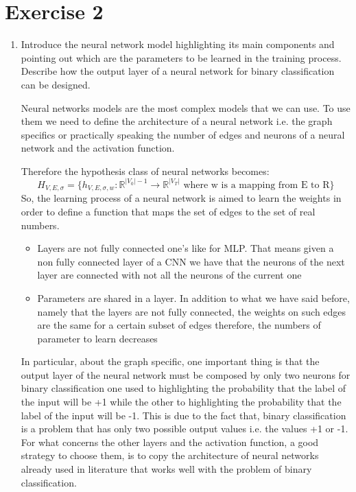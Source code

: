 \documentclass[a4paper,11pt,oneside]{book}
\begin{document}
\section{Exercise 2}
\begin{enumerate}
\item Introduce the neural network model highlighting its main components and pointing out which are the parameters to be learned in the training process. Describe how the output layer of a neural network for binary classification can be designed.
    \begin{solution}        
        Neural networks models are the most complex models that we can use. To use them we need to define the architecture of a neural network i.e. the graph specifics or practically speaking the number of edges and neurons of a neural network and the activation function.
        
        Therefore the hypothesis class of neural networks becomes:
        $$H_{V,E,\sigma} = \{h_{V,E,\sigma,w}: \mathbb{R}^{|V_0|-1} \to \mathbb{R}^{|V_T|} \text{ where w is a mapping from E to R}\}$$
        So, the learning process of a neural network is aimed to learn the weights in order to define a function that maps the set of edges to the set of real numbers.
        
           \begin{itemize}
        \item Layers are not fully connected one's like for MLP. That means given a non fully connected layer of a CNN we have that the neurons of the next layer are connected with not all the neurons of the current one
        
        \item Parameters are shared in a layer. In addition to what we have said before, namely that the layers are not fully connected, the weights on such edges are the same for a certain subset of edges therefore, the numbers of parameter to learn decreases
        \end{itemize}
     In particular, about the graph
 specific, one important thing is that the output layer of the neural network must be composed by only two neurons for binary classification one used to highlighting the probability that the label of the input will be +1 while the other to highlighting the probability that the label of the input will be -1. This is due to the fact that, binary classification is a problem that has only two possible output values i.e. the values +1 or -1. For what concerns the other layers and the activation function, a good strategy to choose them, is to copy the architecture of neural networks already used in literature that works well with the problem of binary classification.
        

\end{solution}
\end{enumerate}
\end{document}
